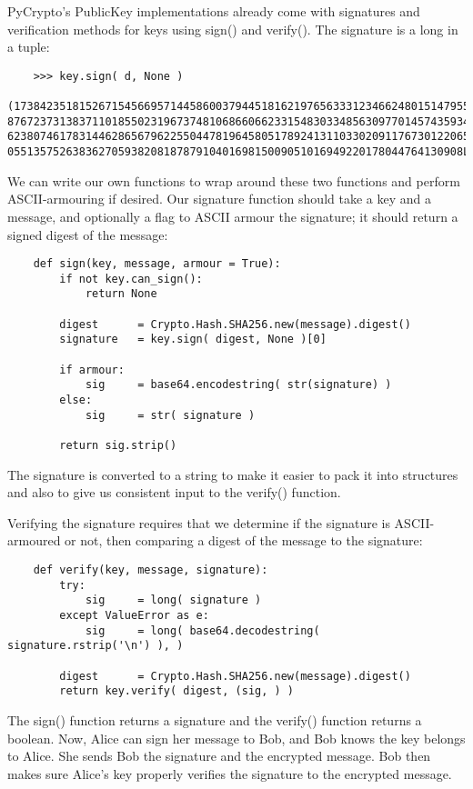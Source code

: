 \documentclass[letterpaper,10pt]{article}
\begin{document}
PyCrypto's PublicKey implementations already come with signatures and 
verification methods for keys using sign() and verify(). The signature
is a long in a tuple:
\begin{verbatim}
    >>> key.sign( d, None )
    (1738423518152671545669571445860037944518162197656333123466248015147955424248
876723731383711018550231967374810686606623315483033485630977014574359346192927942
623807461783144628656796225504478196458051789241311033020911767301220653148276004
0551357526383627059382081878791040169815009051016949220178044764130908L,)
\end{verbatim}

We can write our own functions to wrap around these two functions and perform 
ASCII-armouring if desired. Our signature function should take a key and a 
message, and optionally a flag to ASCII armour the signature; it should return a
signed digest of the message:
\begin{verbatim}
    def sign(key, message, armour = True):
        if not key.can_sign(): 
            return None

        digest      = Crypto.Hash.SHA256.new(message).digest()
        signature   = key.sign( digest, None )[0]

        if armour:
            sig     = base64.encodestring( str(signature) )
        else:
            sig     = str( signature )
    
        return sig.strip()
\end{verbatim}

The signature is converted to a string to make it easier to pack it into 
structures and also to give us consistent input to the verify() function.

Verifying the signature requires that we determine if the signature is
ASCII-armoured or not, then comparing a digest of the message to the signature:
\begin{verbatim}
    def verify(key, message, signature):
        try:
            sig     = long( signature )
        except ValueError as e:
            sig     = long( base64.decodestring( signature.rstrip('\n') ), )

        digest      = Crypto.Hash.SHA256.new(message).digest()
        return key.verify( digest, (sig, ) )
\end{verbatim}

The sign() function returns a signature and the verify() function returns a 
boolean. Now, Alice can sign her message to Bob, and Bob knows the key belongs
to Alice. She sends Bob the signature and the encrypted message. Bob then makes
sure Alice's key properly verifies the signature to the encrypted message.
\end{document}
